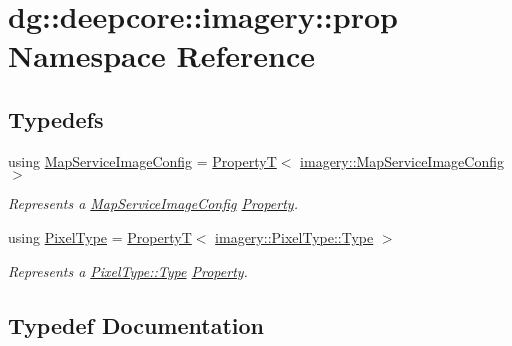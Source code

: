 \hypertarget{namespacedg_1_1deepcore_1_1imagery_1_1prop}{}\section{dg\+:\+:deepcore\+:\+:imagery\+:\+:prop Namespace Reference}
\label{namespacedg_1_1deepcore_1_1imagery_1_1prop}
\subsection*{Typedefs}
\begin{DoxyCompactItemize}
\item 
using \hyperlink{namespacedg_1_1deepcore_1_1imagery_1_1prop_a6258024c09a988041dea18a5d2a8a39e}{Map\+Service\+Image\+Config} = \hyperlink{structdg_1_1deepcore_1_1_property_t}{PropertyT}$<$ \hyperlink{structdg_1_1deepcore_1_1imagery_1_1_map_service_image_config}{imagery\+::\+Map\+Service\+Image\+Config} $>$
\begin{DoxyCompactList}\small\item\em Represents a \hyperlink{structdg_1_1deepcore_1_1imagery_1_1_map_service_image_config}{Map\+Service\+Image\+Config} \hyperlink{classdg_1_1deepcore_1_1_property}{Property}. \end{DoxyCompactList}\item 
using \hyperlink{namespacedg_1_1deepcore_1_1imagery_1_1prop_ae1301ea34a89bf56243b8bd9e9580e65}{Pixel\+Type} = \hyperlink{structdg_1_1deepcore_1_1_property_t}{PropertyT}$<$ \hyperlink{namespacedg_1_1deepcore_1_1imagery_1_1_pixel_type_a5f0c62edf4601cbd15e52b381697069d}{imagery\+::\+Pixel\+Type\+::\+Type} $>$
\begin{DoxyCompactList}\small\item\em Represents a \hyperlink{namespacedg_1_1deepcore_1_1imagery_1_1_pixel_type_a5f0c62edf4601cbd15e52b381697069d}{Pixel\+Type\+::\+Type} \hyperlink{classdg_1_1deepcore_1_1_property}{Property}. \end{DoxyCompactList}\end{DoxyCompactItemize}


\subsection{Typedef Documentation}
